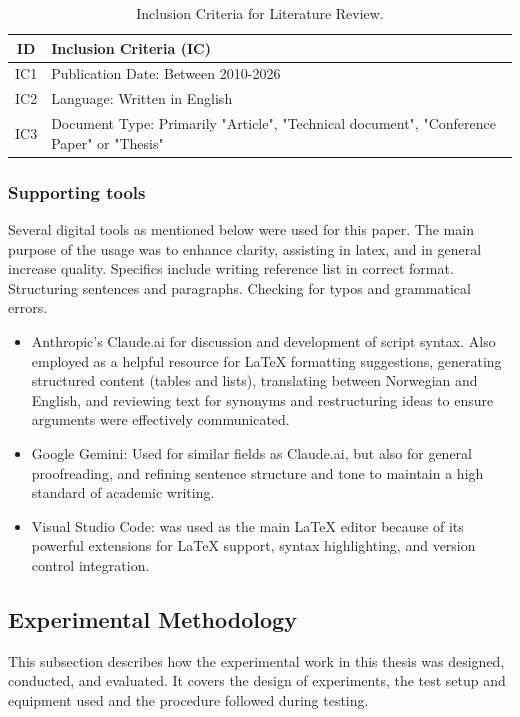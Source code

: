 \begin{table}[h]
    \centering
    \caption{Inclusion Criteria for Literature Review.}\label{tab:inclusion_criteria}
    \begin{tabular}{|c|p{8cm}|}
        \hline
        ID & Inclusion Criteria (IC) \\
        \hline
        IC1 & Publication Date: Between 2010-2026 \\
        \hline
        IC2 & Language: Written in English \\
        \hline
        IC3 & Document Type: Primarily "Article", "Technical document", "Conference Paper" or "Thesis"\\
        \hline
    \end{tabular}
\end{table}

\subsubsection{Supporting tools}

Several digital tools as mentioned below were used for this paper. The main purpose of the usage was to enhance clarity, assisting in latex, and in general increase quality. Specifics include writing reference list in correct format. Structuring sentences and paragraphs. Checking for typos and grammatical errors.

\begin{itemize}
    \item Anthropic's Claude.ai for discussion and development of script syntax. Also employed as a helpful resource for LaTeX formatting suggestions, generating structured content (tables and lists), translating between Norwegian and English, and reviewing text for synonyms and restructuring ideas to ensure arguments were effectively communicated.
    \item Google Gemini: Used for similar fields as Claude.ai, but also for general proofreading, and refining sentence structure and tone to maintain a high standard of academic writing.
    \item Visual Studio Code: was used as the main LaTeX editor because of its powerful extensions for LaTeX support, syntax highlighting, and version control integration.
\end{itemize}

\vspace{5mm}
\subsection{Experimental Methodology}
This subsection describes how the experimental work in this thesis was designed, conducted, and evaluated. It covers the design of experiments, the test setup and equipment used and the procedure followed during testing.


